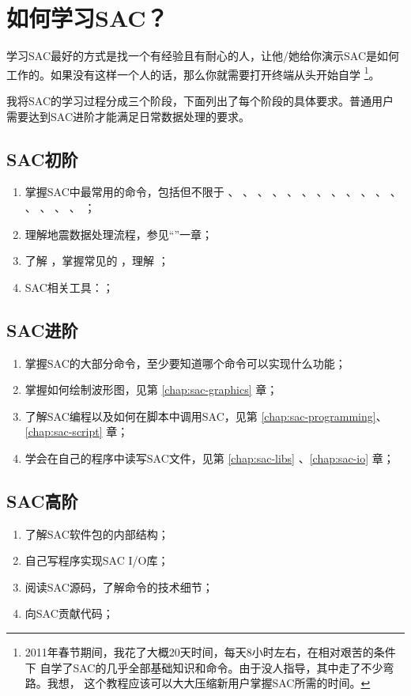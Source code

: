 \section{如何学习SAC？}
学习SAC最好的方式是找一个有经验且有耐心的人，让他/她给你演示SAC是如何
工作的。如果没有这样一个人的话，那么你就需要打开终端从头开始自学
\footnote{
2011年春节期间，我花了大概20天时间，每天8小时左右，在相对艰苦的条件下
自学了SAC的几乎全部基础知识和命令。由于没人指导，其中走了不少弯路。我想，
这个教程应该可以大大压缩新用户掌握SAC所需的时间。}。

我将SAC的学习过程分成三个阶段，下面列出了每个阶段的具体要求。普通用户
需要达到SAC进阶才能满足日常数据处理的要求。

\subsection*{SAC初阶}
\begin{enumerate}
    \item 掌握SAC中最常用的命令，包括但不限于
            、
            、
            、
            、
            、
            、
            、
            、
            、
            、
            、
            、
            、
            、
            、
            、
            ；
        \item 理解地震数据处理流程，参见``''一章；
        \item 了解 ，掌握常见的
            ，理解 ；
        \item SAC相关工具：；
\end{enumerate}

\subsection*{SAC进阶}
\begin{enumerate}
\item 掌握SAC的大部分命令，至少要知道哪个命令可以实现什么功能；
\item 掌握如何绘制波形图，见第 \ref{chap:sac-graphics} 章；
\item 了解SAC编程以及如何在脚本中调用SAC，见第 \ref{chap:sac-programming}、\ref{chap:sac-script} 章；
\item 学会在自己的程序中读写SAC文件，见第 \ref{chap:sac-libs} 、\ref{chap:sac-io} 章；
\end{enumerate}

\subsection*{SAC高阶}
\begin{enumerate}
\item 了解SAC软件包的内部结构；
\item 自己写程序实现SAC I/O库；
\item 阅读SAC源码，了解命令的技术细节；
\item 向SAC贡献代码；
\end{enumerate}
